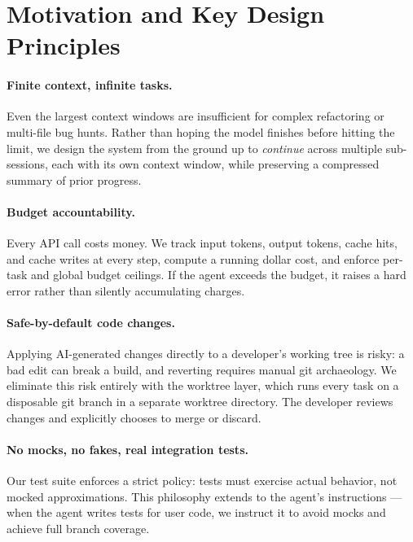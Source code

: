 \documentclass{article}
\begin{document}
\section{Motivation and Key Design Principles}
\label{sec:motivation}

\paragraph{Finite context, infinite tasks.}
Even the largest context windows are insufficient for complex
refactoring or multi-file bug hunts.  Rather than hoping the model
finishes before hitting the limit, we design the system from the
ground up to \emph{continue} across multiple sub-sessions, each with
its own context window, while preserving a compressed summary of prior
progress.

\paragraph{Budget accountability.}
Every API call costs money.  We track input tokens, output tokens,
cache hits, and cache writes at every step, compute a running dollar
cost, and enforce per-task and global budget ceilings.  If the agent
exceeds the budget, it raises a hard error rather than silently
accumulating charges.

\paragraph{Safe-by-default code changes.}
Applying AI-generated changes directly to a developer's working tree
is risky: a bad edit can break a build, and reverting requires manual
git archaeology.  We eliminate this risk entirely with the worktree layer, which runs
every task on a disposable git branch in a separate worktree
directory.  The developer reviews changes and explicitly chooses to
merge or discard.

\paragraph{No mocks, no fakes, real integration tests.}
Our test suite enforces a strict policy: tests must exercise actual
behavior, not mocked approximations.  This philosophy extends to the
agent's instructions --- when the agent writes tests for user code, we
instruct it to avoid mocks and achieve full branch coverage.
\end{document}
